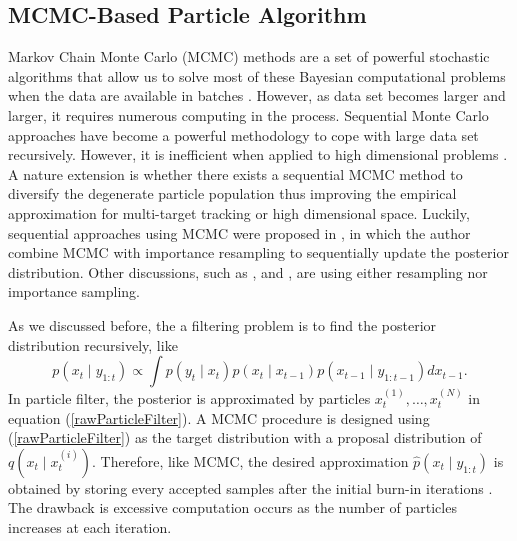 \subsection{MCMC-Based Particle Algorithm}

Markov Chain Monte Carlo (MCMC) methods are a set of powerful stochastic algorithms that allow us to solve most of these Bayesian computational problems when the data are available in batches \cite{tierney1994markov}. However, as data set becomes larger and larger, it requires numerous computing in the process. Sequential Monte Carlo approaches have become a powerful methodology to cope with large data set recursively. However, it is inefficient when applied to high dimensional problems \cite{septier2009mcmc}. A nature extension is whether there exists a sequential MCMC method to diversify the degenerate particle population thus improving the empirical approximation for multi-target tracking or high dimensional space. Luckily, sequential approaches using MCMC were proposed in \cite{berzuini1997dynamic}, in which the author combine MCMC with importance resampling to sequentially update the posterior distribution. 
Other discussions, such as \cite{khan2005mcmc}, \cite{golightly2006bayesian} and \cite{pang2008models}, are using either resampling nor importance sampling. 

As we discussed before, the a filtering problem is to find the posterior distribution recursively, like 
\begin{equation}
p(x_t\mid y_{1:t}) \propto \int p(y_t\mid x_t)p(x_t\mid x_{t-1})p(x_{t-1}\mid y_{1:t-1})dx_{t-1}. 
\end{equation} 
In particle filter, the posterior is approximated by particles $x_t^{(1)},\dots,x_t^{(N)}$ in equation (\ref{rawParticleFilter}). A MCMC procedure is designed using (\ref{rawParticleFilter}) as the target distribution with a proposal distribution of $q(x_t\mid x_t^{(i)})$. Therefore, like MCMC, the desired approximation $\hat{p}(x_t\mid y_{1:t})$ is obtained by storing every accepted samples after the initial burn-in iterations \cite{septier2009mcmc}. The drawback is excessive computation occurs as the number of particles increases at each iteration. 

